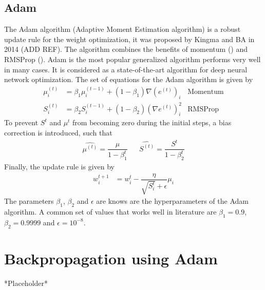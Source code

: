 \subsection*{Adam}
The Adam algorithm (Adaptive Moment Estimation algorithm) is a robust update rule for the weight optimization, it was proposed by Kingma and BA in 2014 (ADD REF). The algorithm combines the benefits of momentum () and RMSProp (). Adam is the most popular generalized algorithm performs very well in many cases. It is considered as a state-of-the-art algorithm for deep neural network optimization. The set of equations for the Adam algorithm is given by
\begin{align}
    \nonumber
    \mu^{(t)}_i &= \beta_1 {\mu}^{(t-1)}_i + (1-\beta_1)\nabla(e^{(t)})_i &\text{Momentum} \\
    \nonumber
    {S}^{(t)}_i &= \beta_2 {S}^{(t-1)}_i + (1-\beta_2)(\nabla e^{(t)})_i^2 &\text{RMSProp}    
\end{align}
To prevent $S^t$ and $\mu^t$ from becoming zero during the initial steps, a bias correction is introduced, such that
\begin{align*}
    \hat{\mu^{(t)}} = \dfrac{\mu}{1-\beta_1^t} & & \hat{S^{(t)}} = \dfrac{S^t}{1-\beta_2^t}
\end{align*}
Finally, the update rule is given by
\begin{align}
    \label{eq:Adam_def}
    {w}^{t+1}_i &= {w}^t_i - \dfrac{\eta}{\sqrt{S^t_i} + \epsilon}\mu_i
\end{align}
The parameters $\beta_1$, $\beta_2$ and $\epsilon$ are knows are the hyperparameters of the Adam algorithm. A common set of values that works well in literature are $\beta_1 = 0.9$, $\beta_2 = 0.9999$ and $\epsilon = 10^{-8}$.
\section{Backpropagation using Adam}
*Placeholder*